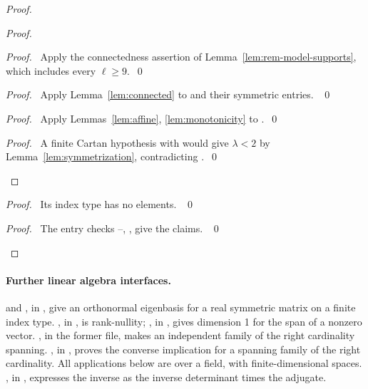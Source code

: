 \begin{proof}
\begin{proof}
\begin{proof}\pf\ Apply the connectedness assertion of
Lemma~\ref{lem:rem-model-supports}, which includes every $\ell\geq9$.~\qed\end{proof}
\begin{proof}\pf\ Apply Lemma~\ref{lem:connected} to
 and their symmetric entries. ~\qed\end{proof}
\begin{proof}\pf\ Apply Lemmas~\ref{lem:affine}, \ref{lem:monotonicity}
to .~\qed\end{proof}
\qedstep
\begin{proof}\pf\ A finite Cartan hypothesis with
 would give $\lambda<2$ by
Lemma~\ref{lem:symmetrization}, contradicting .~\qed\end{proof}
\end{proof}
\begin{proof}\pf\ Its index type has no elements. ~\qed\end{proof}
\qedstep
\begin{proof}\pf\ The entry checks --,
,  give the claims. ~\qed\end{proof}
\end{proof}

\paragraph{Further linear algebra interfaces.}\label{facts:rem-dimension}
\begingroup\raggedright
{} and
, in
, give an orthonormal
eigenbasis for a real symmetric matrix on a finite index type.
, in
, is rank-nullity;
, in
, gives dimension
1 for the span of a nonzero vector.
, in the former
file, makes an independent family of the right cardinality spanning.
, in
, proves the
converse implication for a spanning family of the right cardinality.
All applications below are over a field, with finite-dimensional spaces.
, in
, expresses
the inverse as the inverse determinant times the adjugate.
\par\endgroup

